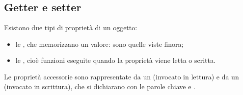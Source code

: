 \subsection{Getter e setter}

Esistono due tipi di proprietà di un oggetto:

\begin{itemize}
  \item le , che memorizzano un valore: sono quelle viste
        finora;
  \item le , cioè funzioni eseguite quando la
        proprietà viene letta o scritta.
\end{itemize}

Le proprietà accessorie sono rappresentate da un  (invocato in
lettura) e da un  (invocato in scrittura), che si dichiarano con le
parole chiave  e .

